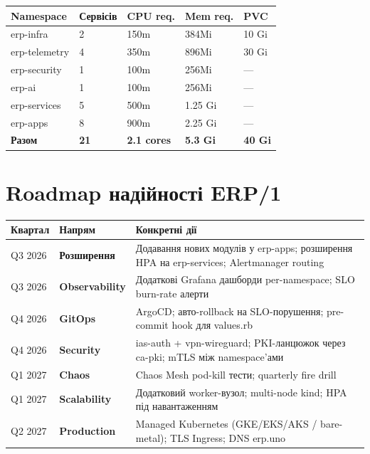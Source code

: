 \documentclass[12pt,a4paper]{article}
\begin{document}
\begin{longtable}{L{3.5cm} R{1.8cm} R{2.5cm} R{2.5cm} R{2.5cm}}
\toprule
{}
\color{primary}\textbf{Namespace} &
\color{primary}\textbf{Сервісів} &
\color{primary}\textbf{CPU req.} &
\color{primary}\textbf{Mem req.} &
\color{primary}\textbf{PVC} \\
\midrule\endhead\bottomrule\endfoot
erp-infra     & 2  & 150m   & 384Mi   & 10 Gi \\[2pt]
erp-telemetry & 4  & 350m   & 896Mi   & 30 Gi \\[2pt]
erp-security  & 1  & 100m   & 256Mi   & --- \\[2pt]
erp-ai        & 1  & 100m   & 256Mi   & --- \\[2pt]
erp-services  & 5  & 500m   & 1.25 Gi & --- \\[2pt]
erp-apps      & 8  & 900m   & 2.25 Gi & --- \\[2pt]
\midrule
\textbf{Разом} & \textbf{21} & \textbf{2.1 cores} & \textbf{5.3 Gi} & \textbf{40 Gi} \\[2pt]
\end{longtable}

\newpage
\section{Roadmap надійності ERP/1}

\begin{longtable}{C{1.5cm} L{4cm} L{8.5cm}}
\toprule
{}
\color{primary}\textbf{Квартал} &
\color{primary}\textbf{Напрям} &
\color{primary}\textbf{Конкретні дії} \\
\midrule\endhead\bottomrule\endfoot
Q3 2026 & \textbf{Розширення}    & Додавання нових модулів у erp-apps; розширення HPA на erp-services; Alertmanager routing \\[4pt]
Q3 2026 & \textbf{Observability} & Додаткові Grafana дашборди per-namespace; SLO burn-rate алерти \\[4pt]
Q4 2026 & \textbf{GitOps}        & ArgoCD; авто-rollback на SLO-порушення; pre-commit hook для values.rb \\[4pt]
Q4 2026 & \textbf{Security}      & ias-auth + vpn-wireguard; PKI-ланцюжок через ca-pki; mTLS між namespace'ами \\[4pt]
Q1 2027 & \textbf{Chaos}         & Chaos Mesh pod-kill тести; quarterly fire drill \\[4pt]
Q1 2027 & \textbf{Scalability}   & Додатковий worker-вузол; multi-node kind; HPA під навантаженням \\[4pt]
Q2 2027 & \textbf{Production}    & Managed Kubernetes (GKE/EKS/AKS / bare-metal); TLS Ingress; DNS erp.uno \\[4pt]
\end{longtable}
\end{document}
